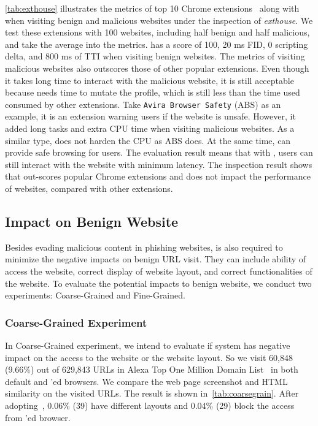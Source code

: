 \autoref{tab:exthouse} illustrates the metrics of top 10 Chrome extensions~\cite{exthouse} along with \spartacus when visiting benign and malicious websites under the inspection of \emph{exthouse}.
We test these extensions with 100 websites, including half benign and half malicious, and take the average into the metrics.
\spartacus has a score of 100, 20 ms FID, 0 scripting delta, and 800 ms of TTI when visiting benign websites.
The metrics of \spartacus visiting malicious websites also outscores those of other popular extensions.
Even though it takes long time to interact with the malicious website, it is still acceptable because \spartacus needs time to mutate the profile, which is still less than the time used consumed by other extensions.
Take \texttt{Avira Browser Safety} (ABS) as an example, it is an extension warning users if the website is unsafe.
However, it added long tasks and extra CPU time when visiting malicious websites.
As a similar type, \spartacus does not harden the CPU as ABS does.
At the same time, \spartacus can provide safe browsing for users.
The evaluation result means that with \spartacus, users can still interact with the website with minimum latency.
The inspection result shows that \spartacus out-scores popular Chrome extensions and does not impact the performance of websites, compared with other extensions.

\subsection{Impact on Benign Website}

Besides evading malicious content in phishing websites, \spartacus is also required to minimize the negative impacts on benign URL visit.
They can include ability of access the website, correct display of website layout, and correct functionalities of the website.
To evaluate the potential impacts to benign website, we conduct two experiments: Coarse-Grained and Fine-Grained.

\subsubsection{Coarse-Grained Experiment}

\coarsegrain

In Coarse-Grained experiment, we intend to evaluate if \spartacus system has negative impact on the access to the website or the website layout.
So we visit 60,848 (9.66\%) out of 629,843 URLs in Alexa Top One Million Domain List~\cite{AlexaTop1M} in both default and \spartacus'ed browsers.
We compare the web page screenshot and HTML similarity on the visited URLs.
The result is shown in~\autoref{tab:coarsegrain}.
After adopting~,
0.06\% (39) have different layouts and 
0.04\% (29) block the access from \spartacus'ed browser.

